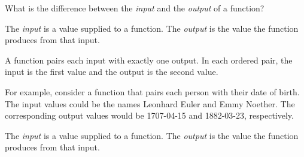 \documentclass[a4paper,11pt]{article}
\begin{document}
\maketitle

\begin{problem}
What is the difference between the \emph{input} and the \emph{output} of a function?
\end{problem}

\begin{solution}
The \emph{input} is a value supplied to a function. The \emph{output} is the value the function produces from that input.

A function pairs each input with exactly one output. In each ordered pair, the input is the first value and the output is the second value.

For example, consider a function that pairs each person with their date of birth. The input values could be the names Leonhard Euler and Emmy Noether. The corresponding output values would be 1707-04-15 and 1882-03-23, respectively.
\end{solution}

\begin{answer}
The \emph{input} is a value supplied to a function. The \emph{output} is the value the function produces from that input.
\end{answer}
\end{document}
